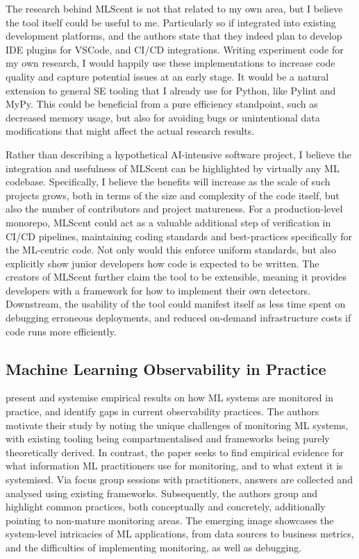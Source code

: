 \documentclass[11pt]{article}
\begin{document}
The research behind MLScent is not that related to my own area, but I believe the tool itself could be useful to me. Particularly so if integrated into existing development platforms, and the authors state that they indeed plan to develop IDE plugins for VSCode, and CI/CD integrations. Writing experiment code for my own research, I would happily use these implementations to increase code quality and capture potential issues at an early stage. It would be a natural extension to general SE tooling that I already use for Python, like Pylint and MyPy. This could be beneficial from a pure efficiency standpoint, such as decreased memory usage, but also for avoiding bugs or unintentional data modifications that might affect the actual research results.

Rather than describing a hypothetical AI-intensive software project, I believe the integration and usefulness of MLScent can be highlighted by virtually any ML codebase. Specifically, I believe the benefits will increase as the scale of such projects grows, both in terms of the size and complexity of the code itself, but also the number of contributors and project matureness. For a production-level monorepo, MLScent could act as a valuable additional step of verification in CI/CD pipelines, maintaining coding standards and best-practices specifically for the ML-centric code. Not only would this enforce uniform standards, but also explicitly show junior developers how code is expected to be written. The creators of MLScent further claim the tool to be extensible, meaning it provides developers with a framework for how to implement their own detectors. Downstream, the usability of the tool could manifest itself as less time spent on debugging erroneous deployments, and reduced on-demand infrastructure costs if code runs more efficiently.

\subsection{Machine Learning Observability in Practice}
\citet{leestMonitoringObservabilityMachine2025} present and systemise empirical results on how ML systems are monitored in practice, and identify gaps in current observability practices. The authors motivate their study by noting the unique challenges of monitoring ML systems, with existing tooling being compartmentalised and frameworks being purely theoretically derived. In contrast, the paper seeks to find empirical evidence for what information ML practitioners use for monitoring, and to what extent it is systemised. Via focus group sessions with practitioners, answers are collected and analysed using existing frameworks. Subsequently, the authors group and highlight common practices, both conceptually and concretely, additionally pointing to non-mature monitoring areas. The emerging image showcases the system-level intricacies of ML applications, from data sources to business metrics, and the difficulties of implementing monitoring, as well as debugging.
\end{document}
